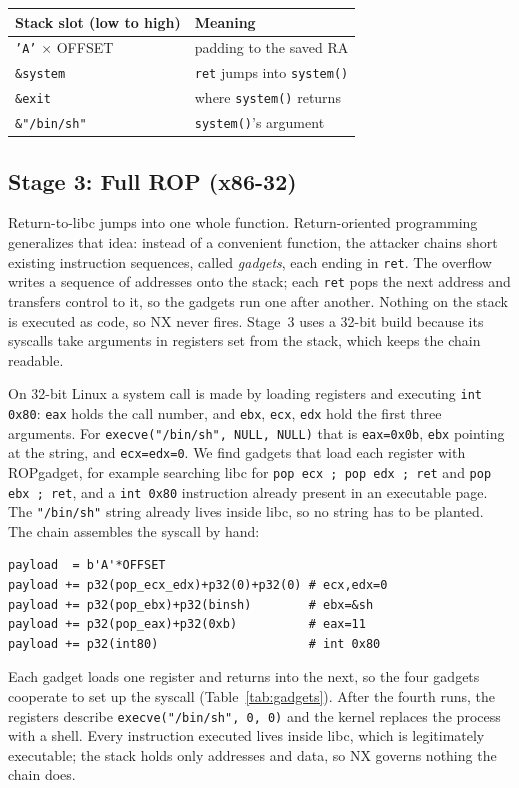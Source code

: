 \documentclass[10pt,twocolumn,letterpaper]{article}
\newcommand{\code}[1]{\texttt{\small #1}}
\begin{document}
\begin{center}\footnotesize
\begin{tabular}{@{}ll@{}}
\toprule
\textbf{Stack slot (low to high)} & \textbf{Meaning}\\
\midrule
\code{'A'} $\times$ OFFSET & padding to the saved RA\\
\code{\&system} & \code{ret} jumps into \code{system()}\\
\code{\&exit} & where \code{system()} returns\\
\code{\&"/bin/sh"} & \code{system()}'s argument\\
\bottomrule
\end{tabular}
\label{tab:ret2libc}
\end{center}

\subsection{Stage 3: Full ROP (x86-32)}
Return-to-libc jumps into one whole function. Return-oriented programming
generalizes that idea: instead of a convenient function, the attacker chains
short existing instruction sequences, called \emph{gadgets}, each ending in
\code{ret}. The overflow writes a sequence of addresses onto the stack; each
\code{ret} pops the next address and transfers control to it, so the gadgets run
one after another. Nothing on the stack is executed as code, so NX never fires.
Stage~3 uses a 32-bit build because its syscalls take arguments in registers set
from the stack, which keeps the chain readable.

On 32-bit Linux a system call is made by loading registers and executing
\code{int 0x80}: \code{eax} holds the call number, and \code{ebx}, \code{ecx},
\code{edx} hold the first three arguments. For \code{execve("/bin/sh", NULL,
NULL)} that is \code{eax=0x0b}, \code{ebx} pointing at the string, and
\code{ecx=edx=0}. We find gadgets that load each register with ROPgadget, for
example searching libc for \code{pop ecx ; pop edx ; ret} and \code{pop ebx ;
ret}, and a \code{int 0x80} instruction already present in an executable page.
The \code{"/bin/sh"} string already lives inside libc, so no string has to be
planted. The chain assembles the syscall by hand:
\begin{lstlisting}[style=py]
payload  = b'A'*OFFSET
payload += p32(pop_ecx_edx)+p32(0)+p32(0) # ecx,edx=0
payload += p32(pop_ebx)+p32(binsh)        # ebx=&sh
payload += p32(pop_eax)+p32(0xb)          # eax=11
payload += p32(int80)                     # int 0x80
\end{lstlisting}
\noindent Each gadget loads one register and returns into the next, so the four
gadgets cooperate to set up the syscall (Table~\ref{tab:gadgets}). After the
fourth runs, the registers describe \code{execve("/bin/sh", 0, 0)} and the kernel
replaces the process with a shell. Every instruction executed lives inside libc,
which is legitimately executable; the stack holds only addresses and data, so NX
governs nothing the chain does.
\end{document}
